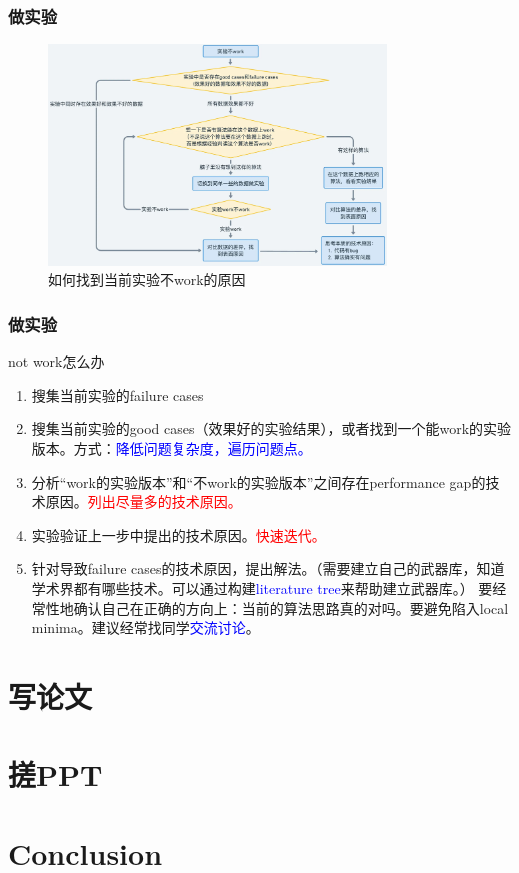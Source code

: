 \documentclass{beamer}
\begin{document}
\begin{frame}
    \frametitle{做实验}
    \begin{figure}[h]
        \centering
        \includegraphics[width=0.8\textwidth]{figure/idea_not_work.png}
        \caption{如何找到当前实验不work的原因}
        \label{fig:experiment}
    \end{figure}
\end{frame}


\begin{frame}
    \frametitle{做实验}
    \begin{block}{not work怎么办}
        \begin{enumerate}
            \item 搜集当前实验的failure cases
            \item 搜集当前实验的good cases（效果好的实验结果），或者找到一个能work的实验版本。方式：\textcolor{blue}{降低问题复杂度，遍历问题点。}
            \item 分析“work的实验版本”和“不work的实验版本”之间存在performance gap的技术原因。\textcolor{red}{列出尽量多的技术原因。}
            \item 实验验证上一步中提出的技术原因。\textcolor{red}{快速迭代。}
            \item 针对导致failure cases的技术原因，提出解法。（需要建立自己的武器库，知道学术界都有哪些技术。可以通过构建\textcolor{blue}{literature tree}来帮助建立武器库。）
            要经常性地确认自己在正确的方向上：当前的算法思路真的对吗。要避免陷入local minima。建议经常找同学\textcolor{blue}{交流讨论}。
        \end{enumerate}
    \end{block}
\end{frame}

\section{写论文}

\section{搓PPT}

\section{Conclusion}
\end{document}
